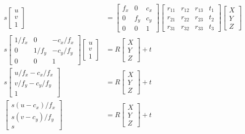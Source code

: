 \documentclass[12pt,a4paper]{article}
\begin{document}
    \begin{align*}
    s \begin{bmatrix} u \\ v \\ 1 \end{bmatrix} &= \begin{bmatrix} f_x & 0 & c_x \\ 0 & f_y & c_y \\ 0 & 0 & 1 \end{bmatrix} \begin{bmatrix} r_{11} & r_{12} & r_{13} & t_1 \\ r_{21} & r_{22} & r_{23} & t_2 \\ r_{31} & r_{32} & r_{33} & t_3 \end{bmatrix} \begin{bmatrix} X \\ Y \\ Z \end{bmatrix} \\
    s \begin{bmatrix} 1/f_x & 0 & -c_x/f_x \\ 0 & 1/f_y & -c_y/f_y \\ 0 & 0 & 1 \end{bmatrix}\begin{bmatrix} u \\ v \\ 1 \end{bmatrix} &= R \begin{bmatrix} X \\ Y \\ Z \end{bmatrix} + t \\
    s \begin{bmatrix} u/f_x - c_x/f_x \\ v/f_y - c_y/f_y \\ 1 \end{bmatrix} &= R \begin{bmatrix} X \\ Y \\ Z \end{bmatrix} + t \\
    \begin{bmatrix} s(u-c_x)/f_x \\ s(v-c_y)/f_y \\ s \end{bmatrix} &= R \begin{bmatrix} X \\ Y \\ Z \end{bmatrix} + t 
    \end{align*}
\end{document}
